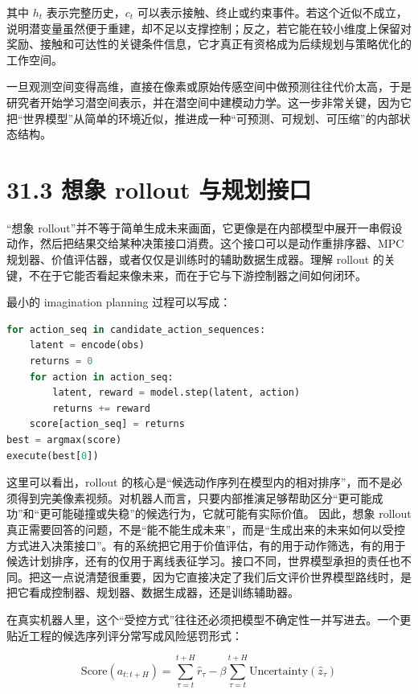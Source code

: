 其中 \(h_t\) 表示完整历史，\(c_t\) 可以表示接触、终止或约束事件。若这个近似不成立，说明潜变量虽然便于重建，却不足以支撑控制；反之，若它能在较小维度上保留对奖励、接触和可达性的关键条件信息，它才真正有资格成为后续规划与策略优化的工作空间。

一旦观测空间变得高维，直接在像素或原始传感空间中做预测往往代价太高，于是研究者开始学习潜空间表示，并在潜空间中建模动力学。这一步非常关键，因为它把“世界模型”从简单的环境近似，推进成一种“可预测、可规划、可压缩”的内部状态结构。

\section*{31.3 想象 rollout 与规划接口}


“想象 rollout”并不等于简单生成未来画面，它更像是在内部模型中展开一串假设动作，然后把结果交给某种决策接口消费。这个接口可以是动作重排序器、MPC 规划器、价值评估器，或者仅仅是训练时的辅助数据生成器。理解 rollout 的关键，不在于它能否看起来像未来，而在于它与下游控制器之间如何闭环。

最小的 imagination planning 过程可以写成：

\begin{lstlisting}[language=python]
for action_seq in candidate_action_sequences:
    latent = encode(obs)
    returns = 0
    for action in action_seq:
        latent, reward = model.step(latent, action)
        returns += reward
    score[action_seq] = returns
best = argmax(score)
execute(best[0])
\end{lstlisting}

这里可以看出，rollout 的核心是“候选动作序列在模型内的相对排序”，而不是必须得到完美像素视频。对机器人而言，只要内部推演足够帮助区分“更可能成功”和“更可能碰撞或失稳”的候选行为，它就可能有实际价值。 因此，想象 rollout 真正需要回答的问题，不是“能不能生成未来”，而是“生成出来的未来如何以受控方式进入决策接口”。有的系统把它用于价值评估，有的用于动作筛选，有的用于候选计划排序，还有的仅用于离线表征学习。接口不同，世界模型承担的责任也不同。把这一点说清楚很重要，因为它直接决定了我们后文评价世界模型路线时，是把它看成控制器、规划器、数据生成器，还是训练辅助器。

在真实机器人里，这个“受控方式”往往还必须把模型不确定性一并写进去。一个更贴近工程的候选序列评分常写成风险惩罚形式：

\begingroup
\scriptsize
\begin{equation*}
\mathrm{Score}(a_{t:t+H})=
\sum_{\tau=t}^{t+H}\hat{r}_\tau
-\beta \sum_{\tau=t}^{t+H}\mathrm{Uncertainty}(\hat{z}_{\tau})
\end{equation*}
\endgroup

